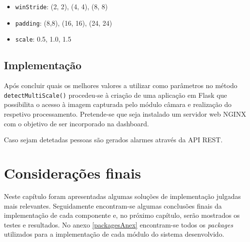 \begin{itemize}
	\item \texttt{winStride}: (2, 2), (4, 4), (8, 8)
	
	\item \texttt{padding}: (8,8), (16, 16), (24, 24)
	
	\item \texttt{scale}: 0.5, 1.0, 1.5 
\end{itemize}


\subsection{Implementação}


Após concluir quais os melhores valores a utilizar como parâmetros no método \linebreak \texttt{detectMultiScale()}  procedeu-se à criação de uma aplicação em Flask que possibilita o acesso à imagem capturada pelo módulo câmara e realização do respetivo processamento. Pretende-se que seja instalado um servidor web NGINX com o objetivo de ser incorporado na dashboard. 


Caso sejam detetadas pessoas são gerados alarmes através da \ac{API} \ac{REST}. 
\fi


\section{Considerações finais}

Neste capítulo foram apresentadas algumas soluções de implementação julgadas mais relevantes. Seguidamente encontram-se algumas conclusões finais da implementação de cada componente e, no próximo capítulo, serão mostrados os testes e resultados. No anexo \ref{packagesAnex} encontram-se todos os \textit{packages} utilizados para a implementação de cada módulo do sistema desenvolvido. 


